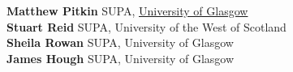 \textbf{Matthew Pitkin} SUPA, \href{https://www.authorea.com/inst/2231}{University of Glasgow} \\
\textbf{Stuart Reid} SUPA, University of the West of Scotland \\
\textbf{Sheila Rowan} SUPA, University of Glasgow \\
\textbf{James Hough} SUPA, University of Glasgow \\

  
  